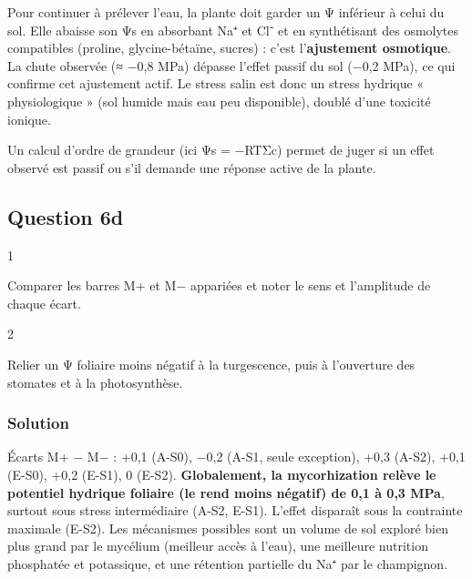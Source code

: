 \documentclass[11pt,a4paper]{article}
\begin{document}
Pour continuer à prélever l'eau, la plante doit garder un Ψ inférieur à celui du sol. Elle abaisse son Ψs en absorbant Na⁺ et Cl⁻ et en synthétisant des osmolytes compatibles (proline, glycine-bétaïne, sucres) : c'est l'\textbf{ajustement osmotique}. La chute observée (≈ −0,8 MPa) dépasse l'effet passif du sol (−0,2 MPa), ce qui confirme cet ajustement actif. Le stress salin est donc un stress hydrique « physiologique » (sol humide mais eau peu disponible), doublé d'une toxicité ionique.

\begin{methode}

Un calcul d'ordre de grandeur (ici Ψs = −RTΣc) permet de juger si un effet observé est passif ou s'il demande une réponse active de la plante.

\end{methode}

\hypertarget{question-6d}{%
\subsection{Question 6d}\label{question-6d}}

\begin{indication}{1}

Comparer les barres M+ et M− appariées et noter le sens et l'amplitude de chaque écart.

\end{indication}

\begin{indication}{2}

Relier un Ψ foliaire moins négatif à la turgescence, puis à l'ouverture des stomates et à la photosynthèse.

\end{indication}

\hypertarget{solution-14}{%
\subsubsection{Solution}\label{solution-14}}

Écarts M+ − M− : +0,1 (A-S0), −0,2 (A-S1, seule exception), +0,3 (A-S2), +0,1 (E-S0), +0,2 (E-S1), 0 (E-S2). \textbf{Globalement, la mycorhization relève le potentiel hydrique foliaire (le rend moins négatif) de 0,1 à 0,3 MPa}, surtout sous stress intermédiaire (A-S2, E-S1). L'effet disparaît sous la contrainte maximale (E-S2). Les mécanismes possibles sont un volume de sol exploré bien plus grand par le mycélium (meilleur accès à l'eau), une meilleure nutrition phosphatée et potassique, et une rétention partielle du Na⁺ par le champignon.
\end{document}
